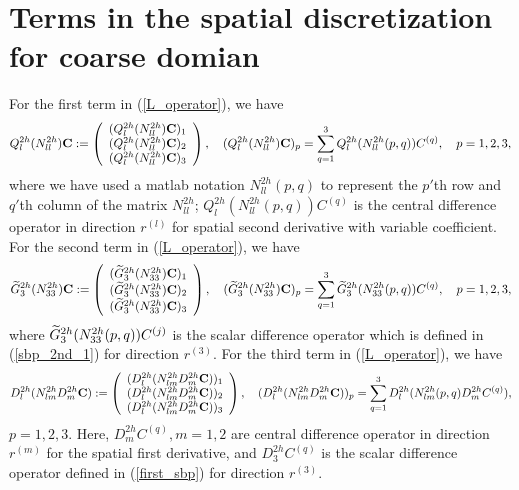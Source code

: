\section{Terms in the spatial discretization for coarse domian}\label{appendix_cdomain}
For the first term in (\ref{L_operator}), we have
\begin{align*}
{Q}_l^{2h}({N}_{ll}^{2h}){\bf C} := \left(\begin{array}{c}
({Q}_l^{2h}({N}_{ll}^{2h}){\bf C})_1 \\
({Q}_l^{2h}({N}_{ll}^{2h}){\bf C})_2 \\
({Q}_l^{2h}({N}_{ll}^{2h}){\bf C})_3 
\end{array}\right), \quad ({Q}_l^{2h}({N}_{ll}^{2h}){\bf C})_p = \sum_{q = 1}^{3} Q_l^{2h}(N_{ll}^{2h}(p,q)) {C}^{(q)},\quad p = 1,2,3,
\end{align*}
where we have used a matlab notation $N_{ll}^{2h}(p,q)$ to represent the $p'$th row and $q'$th column of the matrix $N_{ll}^{2h}$; $Q_l^{2h}(N_{ll}^{2h}(p,q)){ C}^{(q)}$ is the central difference operator in direction $r^{(l)}$ for spatial second derivative with variable coefficient. For the second term in (\ref{L_operator}), we have
\begin{align*}
\widetilde{{G}}_3^{2h}({N}_{33}^{2h}){\bf C} := \left(\begin{array}{c}
(\widetilde{{G}}_3^{2h}({N}_{33}^{2h}){\bf C})_1 \\
(\widetilde{{G}}_3^{2h}({N}_{33}^{2h}){\bf C})_2 \\
(\widetilde{{G}}_3^{2h}({N}_{33}^{2h}){\bf C})_3 
\end{array}\right), \quad (\widetilde{{G}}_3^{2h}({N}_{33}^{2h}){\bf C})_p = \sum_{q = 1}^{3} \widetilde{G}_3^{2h}(N_{33}^{2h}(p,q)) {C}^{(q)},\quad p = 1,2,3,
\end{align*}
where $\widetilde{G}_3^{2h}(N_{33}^{2h}(p,q)) { C}^{(j)}$ is the scalar difference operator which is defined in (\ref{sbp_2nd_1}) for direction $r^{(3)}$. For the third term in (\ref{L_operator}), we have
\begin{align*}
{D}_l^{2h}({N}_{lm}^{2h}{D}_m^{2h}{\bf C}) := \left(\begin{array}{c}
(D^{2h}_l(N^{2h}_{lm}D_m^{2h}{\bf C}))_1 \\
(D^{2h}_l(N^{2h}_{lm}D_m^{2h}{\bf C}))_2 \\
(D^{2h}_l(N^{2h}_{lm}D_m^{2h}{\bf C}))_3 
\end{array}\right), \quad (D^{2h}_l(N^{2h}_{lm}D_m^{2h}{\bf C}))_p = \sum_{q = 1}^{3} D^{2h}_l(N^{2h}_{lm}(p,q)D_m^{2h}{C}^{(q)}),
\end{align*}
$p = 1,2,3$. Here, $D_m^{2h}C^{(q)}, m = 1,2$ are central difference operator in direction $r^{(m)}$ for the spatial first derivative, and $D_3^{2h}C^{(q)}$ is the scalar difference operator defined in (\ref{first_sbp}) for direction $r^{(3)}$.


